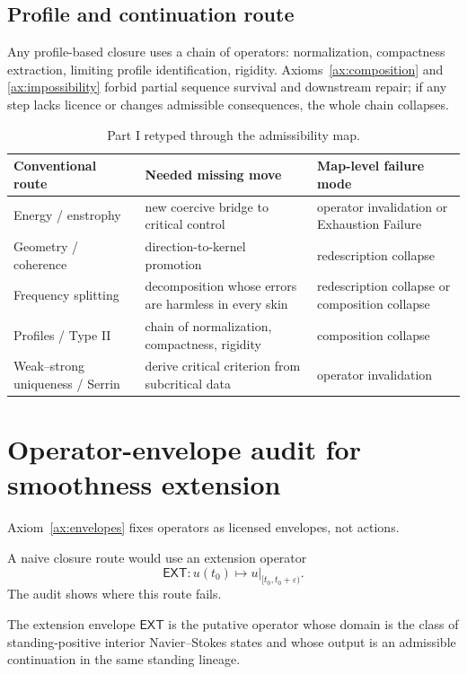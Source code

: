 \subsection{Profile and continuation route}
Any profile-based closure uses a chain of operators: normalization, compactness extraction,
limiting profile identification, rigidity. Axioms~\ref{ax:composition} and \ref{ax:impossibility} forbid
partial sequence survival and downstream repair; if any step lacks licence or changes admissible
consequences, the whole chain collapses.


\begin{table}[t]
\centering
\begin{tabular}{>{\raggedright\arraybackslash}p{} >{\raggedright\arraybackslash}p{} >{\raggedright\arraybackslash}p{}}
\toprule
\textbf{Conventional route} & \textbf{Needed missing move} & \textbf{Map-level failure mode} \\
\midrule
Energy / enstrophy & new coercive bridge to critical control & operator invalidation or Exhaustion Failure \\
Geometry / coherence & direction-to-kernel promotion & redescription collapse \\
Frequency splitting & decomposition whose errors are harmless in every skin & redescription collapse or composition collapse \\
Profiles / Type II & chain of normalization, compactness, rigidity & composition collapse \\
Weak--strong uniqueness / Serrin & derive critical criterion from subcritical data & operator invalidation \\
\bottomrule
\end{tabular}
\caption{Part I retyped through the admissibility map.}
\label{tab:mapfailures}
\end{table}

\section{Operator-envelope audit for smoothness extension}
Axiom~\ref{ax:envelopes} fixes operators as licensed envelopes, not actions.

A naive closure route would use an extension operator
\[
\mathsf{EXT}: u(t_0) \mapsto u|_{[t_0,t_0+\varepsilon)}.
\]
The audit shows where this route fails.

\begin{definition}\label{def:ext-envelope}
The extension envelope $\mathsf{EXT}$ is the putative operator whose domain is the class of
standing-positive interior Navier--Stokes states and whose output is an admissible continuation in
the same standing lineage.
\end{definition}


